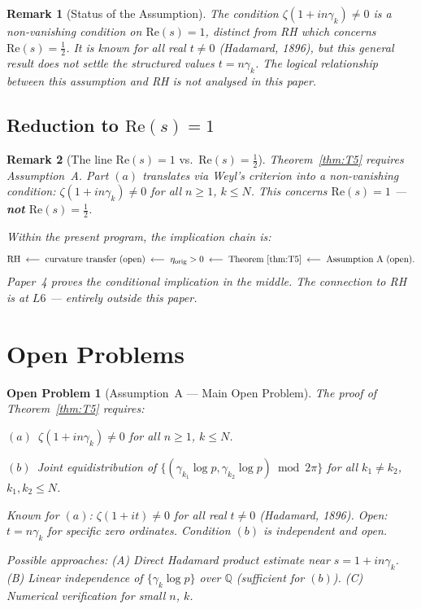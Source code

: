 \documentclass[11pt]{article}
\newtheorem*{remark}{Remark}
\newtheorem*{openproblem}{Open Problem}
\newcommand{\etaorig}{\eta_{\mathrm{orig}}}
\begin{document}
\begin{remark}[Status of the Assumption]
The condition $\zeta(1+in\gamma_k)\neq 0$ is a non-vanishing condition
on $\mathrm{Re}(s)=1$, distinct from RH which concerns
$\mathrm{Re}(s)=\tfrac{1}{2}$.
It is known for all real $t\neq 0$ (Hadamard, 1896), but this general
result does not settle the structured values $t = n\gamma_k$.
The logical relationship between this assumption and RH is not analysed
in this paper.
\end{remark}

\subsection{Reduction to $\mathrm{Re}(s) = 1$}

\begin{remark}[The line $\mathrm{Re}(s)=1$ vs.\ $\mathrm{Re}(s)=\tfrac{1}{2}$]
Theorem~\ref{thm:T5} requires Assumption~A.
Part $(a)$ translates via Weyl's criterion into a non-vanishing condition:
$\zeta(1+in\gamma_k)\neq 0$ for all $n\geq 1$, $k\leq N$.
This concerns $\mathrm{Re}(s)=1$ --- \textbf{not} $\mathrm{Re}(s)=\tfrac{1}{2}$.

Within the present program, the implication chain is:
\[
\mathrm{RH}
\;\longleftarrow\; \text{curvature transfer (open)}
\;\longleftarrow\; \etaorig > 0
\;\longleftarrow\; \text{Theorem~\ref{thm:T5}}
\;\longleftarrow\; \text{Assumption~A (open)}.
\]
Paper~4 proves the conditional implication in the middle.
The connection to RH is at $L6$ --- entirely outside this paper.
\end{remark}

\section{Open Problems}

\begin{openproblem}[Assumption~A --- Main Open Problem]
The proof of Theorem~\ref{thm:T5} requires:

$(a)$~$\zeta(1+in\gamma_k)\neq 0$ for all $n\geq 1$, $k\leq N$.

$(b)$~Joint equidistribution of
$\{(\gamma_{k_1}\log p,\gamma_{k_2}\log p)\bmod 2\pi\}$
for all $k_1\neq k_2$, $k_1,k_2\leq N$.

Known for $(a)$: $\zeta(1+it)\neq 0$ for all real $t\neq 0$
(Hadamard, 1896).
Open: $t = n\gamma_k$ for specific zero ordinates.
Condition $(b)$ is independent and open.

Possible approaches:
(A) Direct Hadamard product estimate near $s = 1+in\gamma_k$.
(B) Linear independence of $\{\gamma_k\log p\}$ over $\mathbb{Q}$
  (sufficient for $(b)$).
(C) Numerical verification for small $n$, $k$.
\end{openproblem}
\end{document}
